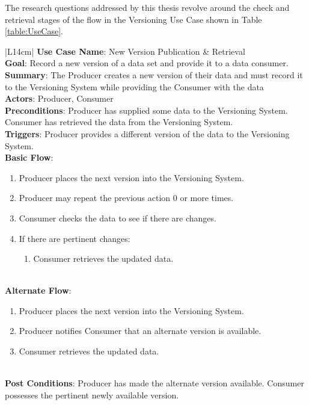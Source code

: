 The research questions addressed by this thesis revolve around the check and retrieval stages of the flow in the Versioning Use Case shown in Table \ref{table:UseCase}.
\begin{table}
	\caption{Versioning Use Case Table}
	\label{table:UseCase}
	\centering
	\begin{tabular}{|L{14cm}|}
		\hline
		\textbf{Use Case Name}: New Version Publication \& Retrieval\\
		\hline
		\textbf{Goal}: Record a new version of a data set and provide it to a data consumer.\\
		\hline
		\textbf{Summary}: The Producer creates a new version of their data and must record it to the Versioning System while providing the Consumer with the data\\
		\hline
		\textbf{Actors}: Producer, Consumer\\
		\hline
		\textbf{Preconditions}: Producer has supplied some data to the Versioning System.   Consumer has retrieved the data from the Versioning System.\\
		\hline
		\textbf{Triggers}: Producer provides a different version of the data to the Versioning System.\\
		\hline
		\textbf{Basic Flow}: 
		\begin{enumerate}
			\item Producer places the next version into the Versioning System.
			\item Producer may repeat the previous action 0 or more times.
			\item Consumer checks the data to see if there are changes.
			\item If there are pertinent changes:
			\begin{enumerate}
				\item Consumer retrieves the updated data.
			\end{enumerate}
		\end{enumerate}\\
		\hline
		\textbf{Alternate Flow}:
		\begin{enumerate}
			\item Producer places the next version into the Versioning System.
			\item Producer notifies Consumer that an alternate version is available.
			\item Consumer retrieves the updated data.
		\end{enumerate}\\
		\hline
		\textbf{Post Conditions}: Producer has made the alternate version available.  Consumer possesses the pertinent newly available version.\\
		\hline
	\end{tabular}
\end{table}
